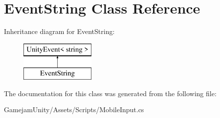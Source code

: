 \hypertarget{class_event_string}{}\section{Event\+String Class Reference}
\label{class_event_string}
Inheritance diagram for Event\+String\+:\begin{figure}[H]
\begin{center}
\leavevmode
\includegraphics[height=2.000000cm]{class_event_string}
\end{center}
\end{figure}


The documentation for this class was generated from the following file\+:\begin{DoxyCompactItemize}
\item 
Gamejam\+Unity/\+Assets/\+Scripts/Mobile\+Input.\+cs\end{DoxyCompactItemize}
